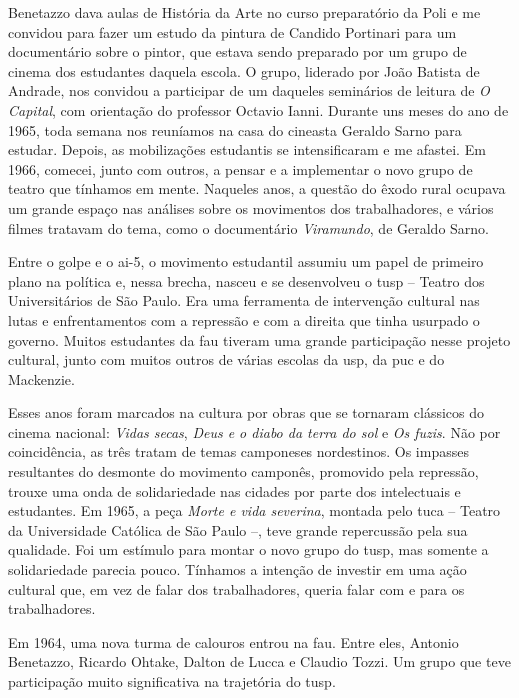 {Benetazzo dava aulas de História da Arte no curso preparatório da Poli e
me convidou para fazer um estudo da pintura de Candido Portinari para um
documentário sobre o pintor, que estava sendo preparado por um grupo de
cinema dos estudantes daquela escola. O grupo, liderado por João
Batista de Andrade, nos convidou a participar de um daqueles seminários
de leitura de {\it O Capital}, com orientação do professor Octavio
Ianni. Durante uns meses do ano de 1965, toda semana nos reuníamos na
casa do cineasta Geraldo Sarno para estudar. Depois, as mobilizações
estudantis se intensificaram e me afastei. Em 1966, comecei, junto com
outros, a pensar e a implementar o novo grupo de teatro que tínhamos em
mente. Naqueles anos, a questão do êxodo rural ocupava um grande espaço nas
análises sobre os movimentos dos trabalhadores, e vários filmes tratavam
do tema, como o documentário {\it Viramundo}, de Geraldo Sarno.

Entre o golpe e o {\sc ai}-5, o movimento estudantil assumiu um papel de
primeiro plano na política e, nessa brecha, nasceu e se
desenvolveu o {\sc tusp} -- Teatro dos Universitários de São Paulo. Era uma
ferramenta de intervenção cultural nas lutas e enfrentamentos com a
repressão e com a direita que tinha usurpado o governo. Muitos estudantes da
{\sc fau} tiveram uma grande participação nesse projeto cultural, junto com
muitos outros de várias escolas da {\sc usp}, da {\sc puc} e do Mackenzie.

\subject{O {\cap tusp}}

Esses anos foram marcados na cultura por obras que se tornaram clássicos
do cinema nacional: {\it Vidas secas}, {\it Deus e o diabo da terra do
sol} e {\it Os fuzis}. Não por coincidência, as três tratam de temas
camponeses nordestinos. Os impasses resultantes do desmonte do movimento camponês, promovido pela repressão, trouxe uma onda de solidariedade nas
cidades por parte dos intelectuais e estudantes. Em 1965, a peça
{\it Morte e vida severina}, montada pelo {\sc tuca} -- Teatro da Universidade
Católica de São Paulo --, teve grande repercussão pela sua qualidade. Foi um
estímulo para montar o novo grupo do {\sc tusp}, mas somente a solidariedade
parecia pouco. Tínhamos a intenção de investir em uma ação cultural que,
em vez de falar dos trabalhadores, queria falar com e para os
trabalhadores.

Em 1964, uma nova turma de calouros entrou na {\sc fau}. Entre eles, Antonio
Benetazzo, Ricardo Ohtake, Dalton de Lucca e Claudio Tozzi. Um grupo que
teve participação muito significativa na trajetória do {\sc tusp}.

}
